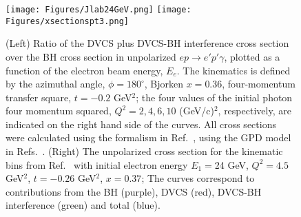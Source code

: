 \begin{figure}
\centerline{
\texttt{[image: Figures/Jlab24GeV.png]}
\texttt{[image: Figures/xsectionspt3.png]}
}
\caption{(Left) Ratio of the DVCS plus DVCS-BH interference cross section over the BH cross section in unpolarized $ep \rightarrow e'p' \gamma$, plotted as a function of the electron beam energy, $E_e$. The kinematics is defined by the azimuthal angle, $\phi=180^\circ$, Bjorken $x=0.36$, four-momentum transfer square, $t=-0.2$ GeV$^2$; the four values of the initial photon four momentum squared, $Q^2 =2, 4, 6, 10$ (GeV/c)$^2$, respectively, are indicated on the right hand side of the curves. All cross sections were calculated using the formalism in Ref.~\cite{Kriesten:2019jep}, using the GPD model in Refs.~\cite{Goldstein:2010gu,Kriesten:2021sqc}. 
(Right) The unpolarized cross section for the kinematic bins from Ref.~\cite{Georges:2018kyi} with initial electron energy $E_1=$24 GeV, $Q^2= 4.5$ GeV$^2$, $t= -0.26$ GeV$^2$, $x = 0.37$; The curves correspond to contributions from the BH (purple), DVCS (red), DVCS-BH interference (green) and total (blue).}
\label{fig:DVCS/BH}
\end{figure}




